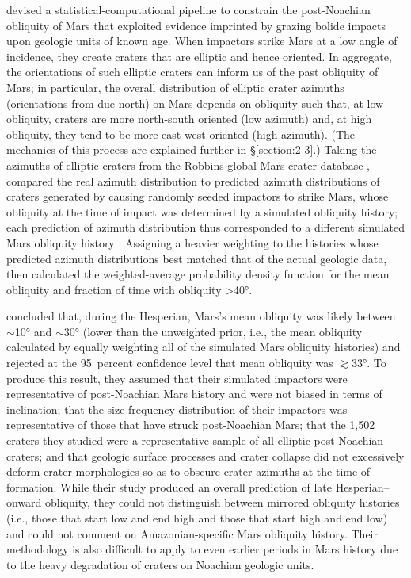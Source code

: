 \documentclass{ucetd}
\begin{document}
\citet{holo2018a} devised a statistical-computational pipeline to constrain the post-Noachian obliquity of Mars that exploited evidence imprinted by grazing bolide impacts upon geologic units of known age. When impactors strike Mars at a low angle of incidence, they create craters that are elliptic and hence oriented. In aggregate, the orientations of such elliptic craters can inform us of the past obliquity of Mars; in particular, the overall distribution of elliptic crater azimuths (orientations from due north) on Mars depends on obliquity such that, at low obliquity, craters are more north-south oriented (low azimuth) and, at high obliquity, they tend to be more east-west oriented (high azimuth). (The mechanics of this process are explained further in §\ref{section:2-3}.) Taking the azimuths of elliptic craters from the Robbins global Mars crater database \citep{robbins2012a}, \citeauthor{holo2018a} compared the real azimuth distribution to predicted azimuth distributions of craters generated by causing randomly seeded impactors to strike Mars, whose obliquity at the time of impact was determined by a simulated obliquity history; each prediction of azimuth distribution thus corresponded to a different simulated Mars obliquity history \cite{kite2015a}. Assigning a heavier weighting to the histories whose predicted azimuth distributions best matched that of the actual geologic data, \citeauthor{holo2018a} then calculated the weighted-average probability density function for the mean obliquity and fraction of time with obliquity >40°.

\citet{holo2018a} concluded that, during the Hesperian, Mars’s mean obliquity was likely between $\sim$10° and $\sim$30° (lower than the unweighted prior, i.e., the mean obliquity calculated by equally weighting all of the simulated Mars obliquity histories) and rejected at the 95~percent confidence level that mean obliquity was $\gtrsim$33°. To produce this result, they assumed that their simulated impactors were representative of post-Noachian Mars history and were not biased in terms of inclination; that the size frequency distribution of their impactors was representative of those that have struck post-Noachian Mars; that the 1,502 craters they studied were a representative sample of all elliptic post-Noachian craters; and that geologic surface processes and crater collapse did not excessively deform crater morphologies so as to obscure crater azimuths at the time of formation. While their study produced an overall prediction of late Hesperian--onward obliquity, they could not distinguish between mirrored obliquity histories (i.e., those that start low and end high and those that start high and end low) and could not comment on Amazonian-specific Mars obliquity history. Their methodology is also difficult to apply to even earlier periods in Mars history due to the heavy degradation of craters on Noachian geologic units.
\end{document}
